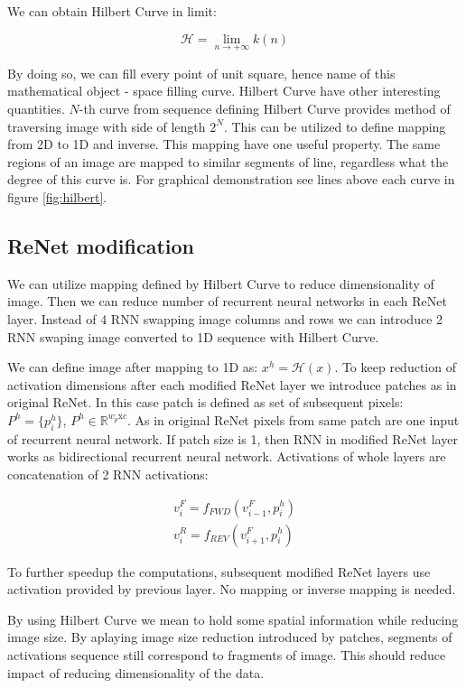 \documentclass[a4paper, 10 pt, conference]{ieeeconf}
\begin{document}
We can obtain Hilbert Curve in limit:

\begin{equation}
	\mathcal{H} = \lim_{n \rightarrow + \infty } k(n)
\end{equation}

By doing so, we can fill every point of unit square, hence name of this mathematical object - space filling curve. Hilbert Curve have other interesting quantities. $N$-th curve from sequence defining Hilbert Curve provides method of traversing image with side of length $2^{N}$. This can be utilized to define mapping from 2D to 1D and inverse. This mapping have one useful property. The same regions of an image are mapped to similar segments of line, regardless what the degree of this curve is. For graphical demonstration see lines above each curve in figure \ref{fig:hilbert}.

\subsection{ReNet modification}

We can utilize mapping defined by Hilbert Curve to reduce dimensionality of image. Then we can reduce number of recurrent neural networks in each ReNet layer. Instead of 4 RNN swapping image columns and rows we can introduce 2 RNN swaping image converted to 1D sequence with Hilbert Curve.

We can define image after mapping to 1D as: $x^{h} = \mathcal{H}(x)$. To keep reduction of activation dimensions after each modified ReNet layer we introduce patches as in original ReNet. In this case patch is defined as set of subsequent pixels: $P^{h} = \{ p_{i}^h \}$, $P^{h} \in \mathbb{R}^{w_p \textrm{x} c}$. As in original ReNet pixels from same patch are one input of recurrent neural network. If patch size is 1, then RNN in modified ReNet layer works as bidirectional recurrent neural network. Activations of whole layers are concatenation of 2 RNN activations:

\begin{gather}
	v_{i}^{F} = f_{FWD}(v_{i-1}^{F}, p_{i}^{h}) \\
	v_{i}^{R} = f_{REV}(v_{i+1}^{F}, p_{i}^{h})
\end{gather}

To further speedup the computations, subsequent modified ReNet layers use activation provided by previous layer. No mapping or inverse mapping is needed.

By using Hilbert Curve we mean to hold some spatial information while reducing image size. By aplaying image size reduction introduced by patches, segments of activations sequence still correspond to fragments of image. This should reduce impact of reducing dimensionality of the data.
\end{document}
